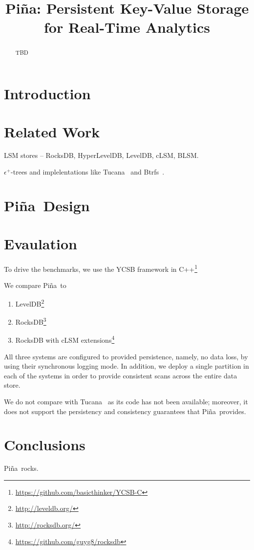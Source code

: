 \documentclass[10pt,preprint,numbers]{sigplanconf}
\date{}
\newcommand{\sys}{Pi\~na}
\begin{document}
\title{\sys: Persistent Key-Value Storage for Real-Time Analytics} 
\maketitle

\begin{abstract}

TBD

\end{abstract}

\section{Introduction}


\section{Related Work}
\label{sec:related}

LSM stores -- RocksDB, HyperLevelDB, LevelDB, cLSM, BLSM.

$\epsilon^+$-trees and implelentations like Tucana~\cite{tucana} and Btrfs~\cite{Btrfs}.

\section{\sys\ Design}
\label{sec:design}


\section{Evaulation}
\label{sec:eval}

To drive the benchmarks, we use the 
YCSB framework in C++\footnote{\url{https://github.com/basicthinker/YCSB-C}}  

We compare \sys\ to 
\begin{enumerate}
\item
LevelDB\footnote{\url{http://leveldb.org/}}
\item
RocksDB\footnote{\url{http://rocksdb.org/}}
\item
RocksDB with cLSM extensions\footnote{\url{https://github.com/guyg8/rocksdb}}
\end{enumerate}
All three systems are configured to provided persistence, namely, no data loss, by using their synchronous logging mode.
In addition, we deploy a single partition in each of the systems in order to provide consistent scans across the entire data store.

We do not compare with Tucana~\cite{tucana} as its code has not been available; moreover, it does not support the persistency and consistency guarantees that \sys\ provides. 


\section{Conclusions}
\label{sec:conclusions}
\sys\ rocks.


 
\end{document}
